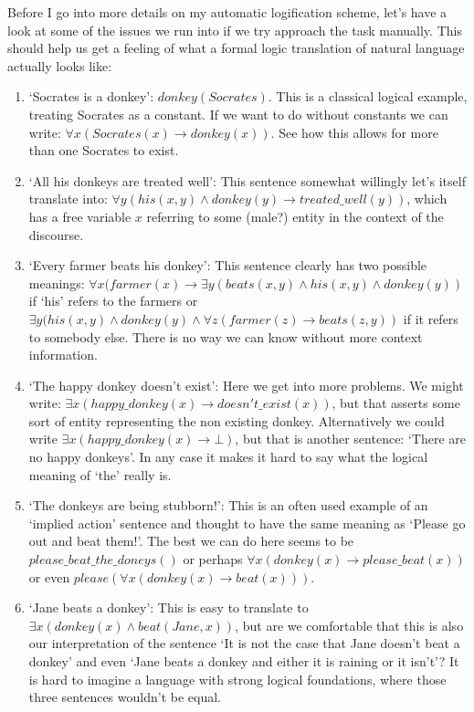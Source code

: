 \documentclass[12pt]{article}
\begin{document}
Before I go into more details on my automatic logification scheme, let's have a look at some of the issues we run into if we try approach the task manually. This should help us get a feeling of what a formal logic translation of natural language actually looks like:
\begin{enumerate}

\item `Socrates is a donkey': $donkey(Socrates)$. This is a classical logical example, treating Socrates as a constant. If we want to do without constants we can write: $\forall x(Socrates(x)\rightarrow donkey(x))$. See how this allows for more than one Socrates to exist.

\item `All his donkeys are treated well': This sentence somewhat willingly let's itself translate into: $\forall y(his(x,y)\wedge donkey(y) \rightarrow treated\_well(y))$, which has a free variable $x$ referring to some (male?) entity in the context of the discourse.

\item `Every farmer beats his donkey': This sentence clearly has two possible meanings: $\forall x(farmer(x)\rightarrow \exists y (beats(x,y)\wedge his(x,y)\wedge donkey(y))$ if `his' refers to the farmers or $\exists y(his(x,y)\wedge donkey(y)\wedge \forall z(farmer(z) \rightarrow beats(z,y))$ if it refers to somebody else. There is no way we can know without more context information.

\item `The happy donkey doesn't exist': Here we get into more problems. We might write: $\exists x(happy\_donkey(x)\rightarrow doesn't\_exist(x))$, but that asserts some sort of entity representing the non existing donkey. Alternatively we could write $\exists x(happy\_donkey(x)\rightarrow \bot)$, but that is another sentence: `There are no happy donkeys'. In any case it makes it hard to say what the logical meaning of `the' really is.

\item `The donkeys are being stubborn!': This is an often used example of an `implied action' sentence and thought to have the same meaning as `Please go out and beat them!'. The best we can do here seems to be $please\_beat\_the\_doneys()$ or perhaps $\forall x(donkey(x)\rightarrow please\_beat(x))$ or even $please(\forall x(donkey(x)\rightarrow beat(x)))$.

\item `Jane beats a donkey': This is easy to translate to $\exists x(donkey(x)\wedge beat(Jane,x))$, but are we comfortable that this is also our interpretation of the sentence `It is not the case that Jane doesn't beat a donkey' and even `Jane beats a donkey and either it is raining or it isn't'? It is hard to imagine a language with strong logical foundations, where those three sentences wouldn't be equal.
\end{enumerate}
\end{document}
